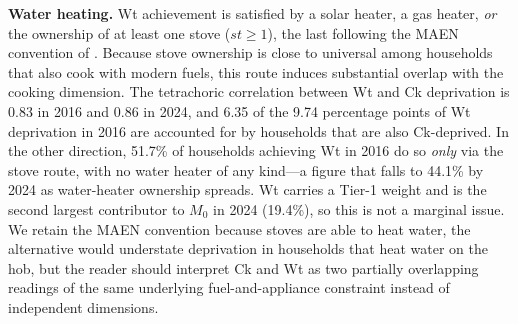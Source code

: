 \documentclass[11pt, a4paper]{article}
\begin{document}
\textbf{Water heating.} Wt achievement is satisfied by a solar heater, a gas heater, \emph{or} the ownership of at least one stove ($st \geq 1$), the last following the MAEN convention of \textcite{garciaochoa2016}. Because stove ownership is close to universal among households that also cook with modern fuels, this route induces substantial overlap with the cooking dimension. The tetrachoric correlation between Wt and Ck deprivation is 0.83 in 2016 and 0.86 in 2024, and 6.35 of the 9.74 percentage points of Wt deprivation in 2016 are accounted for by households that are also Ck-deprived. In the other direction, 51.7\% of households achieving Wt in 2016 do so \emph{only} via the stove route, with no water heater of any kind---a figure that falls to 44.1\% by 2024 as water-heater ownership spreads. Wt carries a Tier-1 weight and is the second largest contributor to $M_0$ in 2024 (19.4\%), so this is not a marginal issue. We retain the MAEN convention because stoves are able to heat water, the alternative would understate deprivation in households that heat water on the hob, but the reader should interpret Ck and Wt as two partially overlapping readings of the same underlying fuel-and-appliance constraint instead of independent dimensions.
\end{document}
